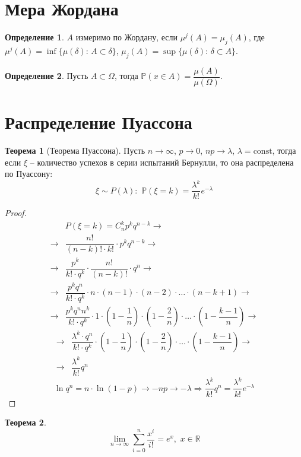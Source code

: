 \documentclass[12pt]{article}
\theoremstyle{definition}
\newtheorem{theorem}{Теорема}[section]
\newtheorem{definition}{Определение}
\newcommand{\R}{\mathbb{R}}
\newcommand{\prob}{\mathbb{P}}
\begin{document}
\section{Мера Жордана}
\begin{definition}
    $A$ измеримо по Жордану, если $\mu^j(A)=\mu_j(A)$, где $\mu^j(A)=\inf\{\mu(\delta):\,A\subset \delta\}$, $\mu_j(A)=\sup\{\mu(\delta):\,\delta \subset A\}$.
\end{definition}
\begin{definition}
    Пусть $A\subset \Omega$, тогда $\prob(x\in A)=\dfrac{\mu(A)}{\mu(\Omega)}$.
\end{definition}

\section{Распределение Пуассона}
\begin{theorem}[Теорема Пуассона]
    Пусть $n\to\infty$, $p\to 0$, $np\to \lambda$, $\lambda=\text{const}$, тогда если $\xi$ -- количество успехов в серии испытаний Бернулли, то она распределена по Пуассону:
    $$\xi \sim P(\lambda):\,\,\prob(\xi=k)=\dfrac{\lambda^k}{k!}e^{-\lambda}$$
\end{theorem}
\begin{proof}
    \begin{align*}
        &P(\xi=k)=C_n^kp^kq^{n-k}\to\\
        \to&\dfrac{n!}{(n-k)!\cdot k!}\cdot p^kq^{n-k}\to\\
        \to&\dfrac{p^k}{k!\cdot q^k}\cdot \dfrac{n!}{(n-k)!}\cdot q^n\to\\
        \to&\dfrac{p^kq^n}{k!\cdot q^k}\cdot n\cdot(n-1)\cdot(n-2)\cdot\ldots\cdot(n-k+1)\to\\
        \to&\dfrac{p^kq^nn^k}{k!\cdot q^k}\cdot 1\cdot\left(1-\dfrac{1}{n}\right)\cdot\left(1-\dfrac{2}{n}\right)\cdot\ldots\cdot\left(1-\dfrac{k-1}{n}\right)\to
    \end{align*}
    \begin{align*}
        \to&\dfrac{\lambda^k\cdot q^n}{k!\cdot q^k}\cdot\left(1-\dfrac{1}{n}\right)\cdot\left(1-\dfrac{2}{n}\right)\cdot\ldots\cdot\left(1-\dfrac{k-1}{n}\right)\to\\
        \to&\dfrac{\lambda^k}{k!}q^n
    \end{align*}
    $$\ln q^n= n\cdot \ln(1-p)\to -np\to-\lambda \Longrightarrow \dfrac{\lambda^k}{k!}q^n = \dfrac{\lambda^k}{k!}e^{-\lambda}$$
\end{proof}
\begin{theorem}
    $$\lim_{n\to\infty}\sum_{i=0}^n\dfrac{x^i}{i!}=e^x,\,\,x\in \R$$
\end{theorem}
\end{document}
